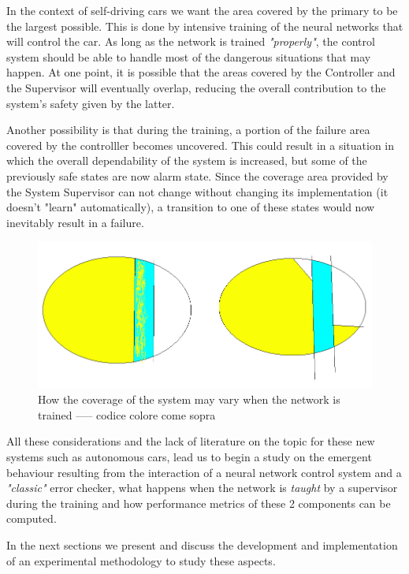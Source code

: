 In the context of self-driving cars we want the area covered by the primary to be the largest possible. This is done by intensive training of the neural networks that will control the car. As long as the network is trained \textsl{"properly"}, the control system should be able to handle most of the dangerous situations that may happen. At one point, it is possible that the areas covered by the Controller and the Supervisor will eventually overlap, reducing the overall contribution to the system's safety given by the latter.

Another possibility is that during the training, a portion of the failure area covered by the controlller becomes uncovered. This could result in a situation in which the overall dependability of the system is increased, but some of the previously safe states are now alarm state. Since the coverage area provided by the System Supervisor can not change without changing its implementation (it doesn't "learn" automatically), a transition to one of these states would now inevitably result in a failure.

\begin{figure}[h!]
	\includegraphics[width=\textwidth]{img/area-growth.png}
	\caption{How the coverage of the system may vary when the network is trained  -----   codice colore come sopra}
\end{figure}

All these considerations and the lack of literature on the topic for these new systems such as autonomous cars, lead us to begin a study on the emergent behaviour resulting from the interaction of a neural network control system and a \textsl{"classic"} error checker, what happens when the network is \textsl{taught} by a supervisor during the training and how performance metrics of these 2 components can be computed.\newline

In the next sections we present and discuss the development and implementation of an experimental methodology to study these aspects.